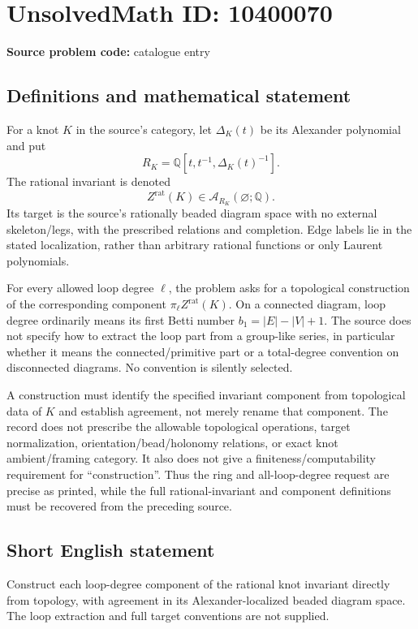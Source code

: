 \documentclass[11pt]{article}
\newcommand{\Q}{\mathbb{Q}}
\begin{document}
\section*{UnsolvedMath ID: 10400070}
\textbf{Source problem code:} catalogue entry
\subsection{Definitions and mathematical statement}
For a knot $K$ in the source's category, let $\Delta_K(t)$ be its Alexander polynomial and put
\[
R_K=\Q[t,t^{-1},\Delta_K(t)^{-1}].
\]
The rational invariant is denoted
\[
Z^{\mathrm{rat}}(K)\in\mathcal A_{R_K}(\varnothing;\Q).
\]
Its target is the source's rationally beaded diagram space with no external skeleton/legs, with the prescribed relations and completion. Edge labels lie in the stated localization, rather than arbitrary rational functions or only Laurent polynomials.

For every allowed loop degree $\ell$, the problem asks for a topological construction of the corresponding component $\pi_\ell Z^{\mathrm{rat}}(K)$. On a connected diagram, loop degree ordinarily means its first Betti number $b_1=|E|-|V|+1$. The source does not specify how to extract the loop part from a group-like series, in particular whether it means the connected/primitive part or a total-degree convention on disconnected diagrams. No convention is silently selected.

A construction must identify the specified invariant component from topological data of $K$ and establish agreement, not merely rename that component. The record does not prescribe the allowable topological operations, target normalization, orientation/bead/holonomy relations, or exact knot ambient/framing category. It also does not give a finiteness/computability requirement for ``construction''. Thus the ring and all-loop-degree request are precise as printed, while the full rational-invariant and component definitions must be recovered from the preceding source.
\subsection{Short English statement}
Construct each loop-degree component of the rational knot invariant directly from topology, with agreement in its Alexander-localized beaded diagram space. The loop extraction and full target conventions are not supplied.
\end{document}
